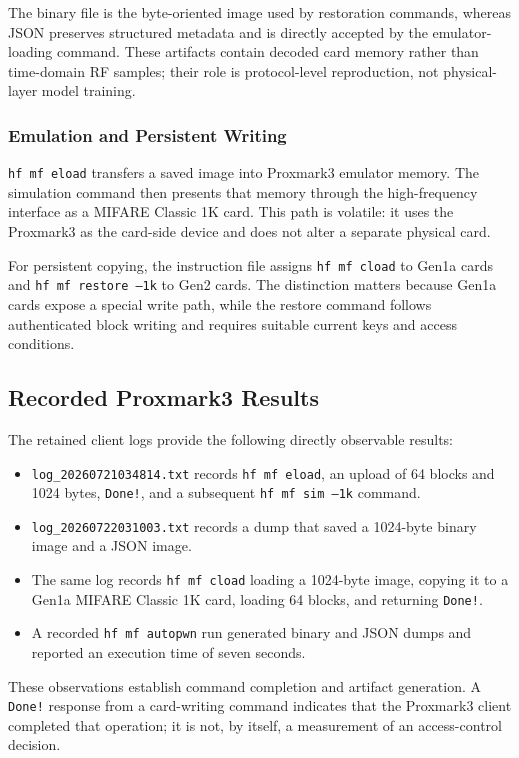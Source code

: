 \documentclass[sigconf]{acmart}
\begin{document}
The binary file is the byte-oriented image used by restoration commands, whereas JSON preserves structured metadata and is directly accepted by the emulator-loading command. These artifacts contain decoded card memory rather than time-domain RF samples; their role is protocol-level reproduction, not physical-layer model training.

\subsubsection{Emulation and Persistent Writing}

\texttt{hf mf eload} transfers a saved image into Proxmark3 emulator memory. The simulation command then presents that memory through the high-frequency interface as a MIFARE Classic 1K card. This path is volatile: it uses the Proxmark3 as the card-side device and does not alter a separate physical card.

For persistent copying, the instruction file assigns \texttt{hf mf cload} to Gen1a cards and \texttt{hf mf restore --1k} to Gen2 cards. The distinction matters because Gen1a cards expose a special write path, while the restore command follows authenticated block writing and requires suitable current keys and access conditions.

\subsection{Recorded Proxmark3 Results}

The retained client logs provide the following directly observable results:

\begin{itemize}
\item \texttt{log\_20260721034814.txt} records \texttt{hf mf eload}, an upload of 64 blocks and 1024 bytes, \texttt{Done!}, and a subsequent \texttt{hf mf sim --1k} command.
\item \texttt{log\_20260722031003.txt} records a dump that saved a 1024-byte binary image and a JSON image.
\item The same log records \texttt{hf mf cload} loading a 1024-byte image, copying it to a Gen1a MIFARE Classic 1K card, loading 64 blocks, and returning \texttt{Done!}.
\item A recorded \texttt{hf mf autopwn} run generated binary and JSON dumps and reported an execution time of seven seconds.
\end{itemize}

These observations establish command completion and artifact generation. A \texttt{Done!} response from a card-writing command indicates that the Proxmark3 client completed that operation; it is not, by itself, a measurement of an access-control decision.
\end{document}
